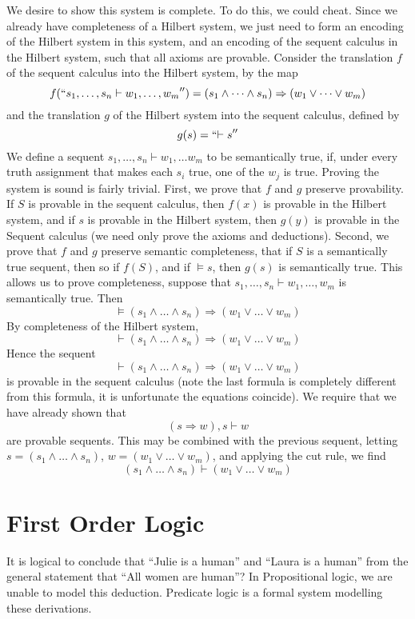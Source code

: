 We desire to show this system is complete. To do this, we could cheat. Since we already have completeness of a Hilbert system, we just need to form an encoding of the Hilbert system in this system, and an encoding of the sequent calculus in the Hilbert system, such that all axioms are provable. Consider the translation $f$ of the sequent calculus into the Hilbert system, by the map
%
\[ f(``{s_1, \dots, s_n \vdash w_1, \dots, w_m}'') = (s_1 \wedge \dots \wedge s_n) \Rightarrow (w_1 \vee \dots \vee w_m) \]
%
and the translation $g$ of the Hilbert system into the sequent calculus, defined by
%
\[ g(s) = ``{\vdash s}'' \]
%
We define a sequent $s_1, \dots, s_n \vdash w_1, \dots w_m $ to be semantically true, if, under every truth assignment that makes each $s_i$ true, one of the $w_j$ is true. Proving the system is sound is fairly trivial. First, we prove that $f$ and $g$ preserve provability. If $S$ is provable in the sequent calculus, then $f(x)$ is provable in the Hilbert system, and if $s$ is provable in the Hilbert system, then $g(y)$ is provable in the Sequent calculus (we need only prove the axioms and deductions). Second, we prove that $f$ and $g$ preserve semantic completeness, that if $S$ is a semantically true sequent, then so if $f(S)$, and if $\vDash s$, then $g(s)$ is semantically true. This allows us to prove completeness, suppose that $s_1, \dots, s_n \vdash w_1, \dots, w_m$ is semantically true. Then
%
\[ \vDash (s_1 \wedge \dots \wedge s_n) \Rightarrow (w_1 \vee \dots \vee w_m) \]
%
By completeness of the Hilbert system,
%
\[ \vdash (s_1 \wedge \dots \wedge s_n) \Rightarrow (w_1 \vee \dots \vee w_m) \]
%
Hence the sequent
%
\[ \vdash (s_1 \wedge \dots \wedge s_n) \Rightarrow (w_1 \vee \dots \vee w_m) \]
%
is provable in the sequent calculus (note the last formula is completely different from this formula, it is unfortunate the equations coincide). We require that we have already shown that
%
\[ (s \Rightarrow w), s \vdash w \]
%
are provable sequents. This may be combined with the previous sequent, letting $s = (s_1 \wedge \dots \wedge s_n)$, $w = (w_1 \vee \dots \vee w_m)$, and applying the cut rule, we find
%
\[ (s_1 \wedge \dots \wedge s_n) \vdash (w_1 \vee \dots \vee w_m) \]


\chapter{First Order Logic}

It is logical to conclude that ``Julie is a human'' and ``Laura is a human'' from the general statement that ``All women are human''? In Propositional logic, we are unable to model this deduction. Predicate logic is a formal system modelling these derivations.

